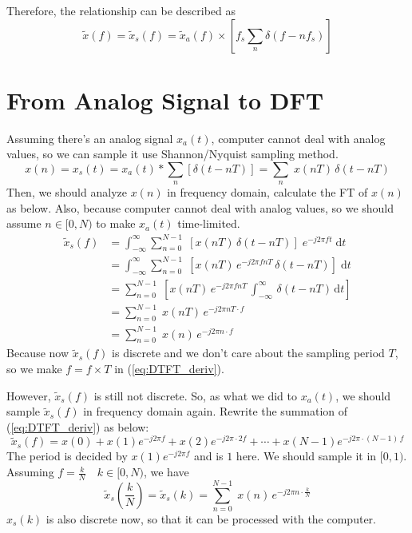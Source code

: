 \documentclass{article}
\begin{document}
Therefore, the relationship can be described as
\begin{equation}
	\widetilde{x}(f) = \widetilde{x}_s(f) = \widetilde{x}_a(f) \times \left[ f_s \sum_n \delta(f - nf_s) \right]
\label{eq:relationship}
\end{equation}

\section{From Analog Signal to DFT}
Assuming there's an analog signal $x_a(t)$, computer cannot deal with analog values, so we can sample it use Shannon/Nyquist sampling method. 
\begin{equation}
x(n) = x_s(t) =  x_a(t) * \sum_{n} \left[ \delta(t- nT) \right] = \sum_{n} \; x(nT) \, \delta(t - nT)
\label{eq:Sampling_Mod}
\end{equation}
Then, we should analyze $x(n)$ in frequency domain, calculate the FT of $x(n)$ as below. Also, because computer cannot deal with analog values, so we should assume $n \in [0, N)$ to make $x_a(t)$ time-limited.
\begin{equation}
\begin{aligned}
	\widetilde{x}_s(f) &= \int_{- \infty}^{\infty} \sum_{n = 0}^{N - 1} \; \left[  x(nT) \, \delta(t - nT) \right] \; e^{-j 2\pi ft}\; \mathrm{d} t \\
	&= \int_{- \infty}^{\infty} \sum_{n = 0}^{N - 1} \; \left[  x(nT)  \, e^{-j 2\pi f nT} \, \delta(t - nT) \right] \; \mathrm{d} t \\
	&= \sum_{n = 0}^{N - 1} \; \left[  x(nT)  \, e^{-j 2\pi f nT} \, \int_{- \infty}^{\infty} \, \delta(t - nT) \, \mathrm{d} t  \right]\\
	&= \sum_{n = 0}^{N - 1} \; x(nT)  \, e^{-j 2\pi nT \cdot f} \\ 
	&= \sum_{n = 0}^{N - 1} \; x(n)  \, e^{-j 2\pi n \cdot f}
\end{aligned}
\label{eq:DTFT_deriv}
\end{equation}
Because now $\widetilde{x}_s(f)$ is discrete and we don't care about the sampling period $T$, so we make $f = f \times T$ in (\ref{eq:DTFT_deriv}).

However, $\widetilde{x}_s(f)$ is still not discrete. So, as what we did to $x_a(t)$, we should sample $\widetilde{x}_s(f)$ in frequency domain again. Rewrite the summation of (\ref{eq:DTFT_deriv}) as below:
$$
\widetilde{x}_s(f) = x(0) + x(1)e^{-j 2\pi f} + x(2)e^{-j 2\pi \cdot 2f} + \cdots + x(N - 1) e^{-j 2\pi \cdot (N - 1)\,f}
$$
The period is decided by $x(1)e^{-j 2\pi f}$ and is $1$ here. We should sample it in $[0, 1)$. Assuming $f = \frac{k}{N} \quad k \in [0, N)$, we have
\begin{equation*}
\widetilde{x}_s(\frac{k}{N}) = \widetilde{x}_s(k) = \sum_{n = 0}^{N - 1} \; x(n)  \, e^{-j 2\pi n \cdot \frac{k}{N}}
\label{eq:DFT}
\end{equation*}
$x_s(k)$ is also discrete now, so that it can be processed with the computer.
\end{document}
